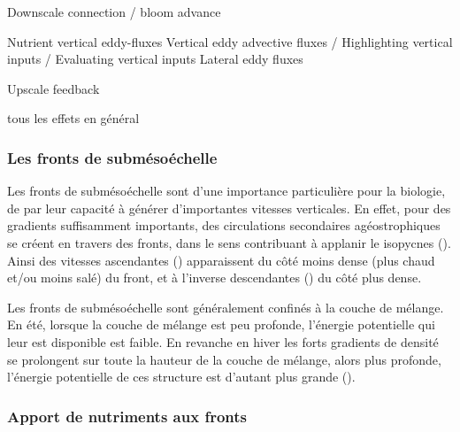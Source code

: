 
Downscale connection / bloom advance

Nutrient vertical eddy-fluxes
Vertical eddy advective fluxes / Highlighting vertical inputs / Evaluating vertical inputs
Lateral eddy fluxes

Upscale feedback

tous les effets en général

\subsubsection{Les fronts de submésoéchelle}

Les fronts de submésoéchelle  sont d'une importance particulière pour la biologie, de par leur capacité à générer d'importantes vitesses verticales.
En effet, pour des gradients suffisamment importants, des circulations secondaires agéostrophiques se créent en travers des fronts, dans le sens contribuant à applanir le isopycnes (\cite{thomas_2008}).
Ainsi des vitesses ascendantes () apparaissent du côté moins dense (plus chaud et/ou moins salé) du front, et à l'inverse descendantes () du côté plus dense.

Les fronts de submésoéchelle sont généralement confinés à la couche de mélange.
En été, lorsque la couche de mélange est peu profonde, l'énergie potentielle qui leur est disponible est faible.
En revanche en hiver les forts gradients de densité se prolongent sur toute la hauteur de la couche de mélange, alors plus profonde, l'énergie potentielle de ces structure est d'autant plus grande (\cite{callies_2015, mensa_2013, sasaki_2020}).

\subsubsection{Apport de nutriments aux fronts}
\label{sec:upwelling-nutriments}

